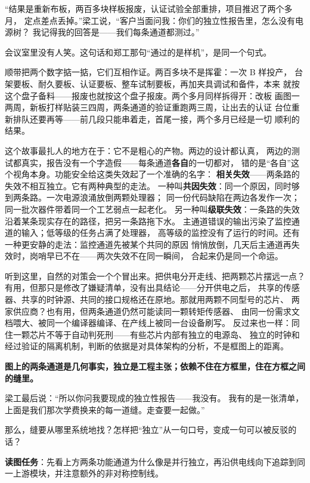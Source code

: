 “结果是重新布板，两百多块样板报废，认证试验全部重排，项目推迟了两个多月，
定点差点丢掉。”梁工说，“客户当面问我：你们的独立性报告里，怎么没有电源树？
我记得我的回答是——我们每条通道都测过。”

会议室里没有人笑。这句话和郑工那句“通过的是样机”，是同一个句式。

顺带把两个数字掂一掂，它们互相作证。两百多块不是挥霍：一次 B 样投产，
台架要板、耐久要板、认证要板、整车试制要板，再加夹具调试和备件，本来
就按这个盘子备料——报废也就按这个盘子报废。两个多月同样拆得开：改板
画图一两周，新板打样贴装三四周，两条通道的验证重跑两三周，让出去的认证
台位重新排队还要再等——前几段只能串着走，首尾一接，两个多月已经是一切
顺利的结果。

这个故事最扎人的地方在于：它不是粗心的产物。两边的设计都认真，
两边的测试都真实，报告没有一个字造假——每条通道\textbf{各自}的一切都对，
错的是“各自”这个视角本身。功能安全给这类失效起了一个准确的名字：
\textbf{相关失效}——两条路的失效不相互独立。它有两种典型的走法。
一种叫\textbf{共因失效}：同一个原因，同时够到两条路。一次电源浪涌放倒两颗处理器；
同一份代码缺陷在两边各发作一次；同一批次器件带着同一个工艺弱点一起老化。
另一种叫\textbf{级联失效}：一条路的失效沿着某条现实存在的路径，把另一条路拖下水。
主通道错误的输出污染了监控通道的输入；低等级的任务占满了处理器，
高等级的监控没有了运行的时间。还有一种更安静的走法：监控通道先被某个共同的原因
悄悄放倒，几天后主通道再失效时，岗哨早已不在——两次失效不在同一瞬间，
合起来仍是同一个命运。

听到这里，自然的对策会一个个冒出来。把供电分开走线、把两颗芯片摆远一点？
有用，但那只是修改了嫌疑清单，没有出具结论——分开供电之后，
共享的传感器、共享的时钟源、共同的接口规格还在原地。那就用两颗不同型号的芯片、
两家供应商？也有用，但两条通道仍然可能读同一颗转矩传感器、
由同一份需求文档喂大、被同一个编译器编译、在产线上被同一台设备刷写。
反过来也一样：同住一颗芯片不等于自动判死刑——有些芯片内部有独立的电源岛、
独立的时钟和经过验证的隔离机制，判断的依据是对具体架构的分析，不是框图上的距离。

\textbf{图上的两条通道是几何事实，独立是工程主张；依赖不住在方框里，住在方框之间的缝里。}

梁工最后说：“所以你问我要现成的独立性报告——我没有。
我有的是一张清单，上面是我们那次学费换来的每一道缝。走查要一起做。”

那么，缝要从哪里系统地找？怎样把“独立”从一句口号，变成一句可以被反驳的话？


\begin{noteblock}
\textbf{读图任务}：先看上方两条功能通道为什么像是并行独立，再沿供电线向下追踪到同一上游模块，并注意额外的非对称控制线。
\end{noteblock}

